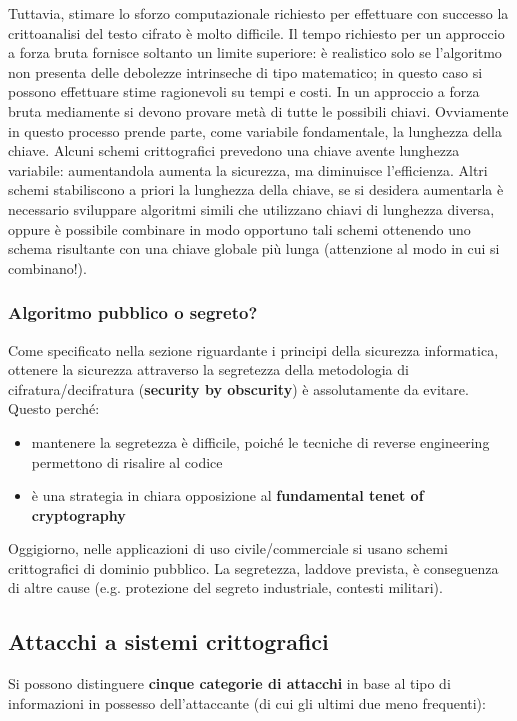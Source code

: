 Tuttavia, stimare lo sforzo computazionale richiesto per effettuare con successo la crittoanalisi del testo cifrato è molto difficile. Il tempo richiesto per un approccio a forza bruta fornisce soltanto un limite superiore: è realistico solo se l’algoritmo non presenta delle debolezze intrinseche di tipo matematico; in questo caso si possono effettuare stime ragionevoli su tempi e costi. In un approccio a forza bruta mediamente si devono provare metà di tutte le possibili chiavi. Ovviamente in questo processo prende parte, come variabile fondamentale, la lunghezza della chiave. Alcuni schemi crittografici prevedono una chiave avente lunghezza variabile: aumentandola aumenta la sicurezza, ma diminuisce l'efficienza. Altri schemi stabiliscono a priori la lunghezza della chiave, se si desidera aumentarla è necessario sviluppare algoritmi simili che utilizzano chiavi di lunghezza diversa, oppure è possibile combinare in modo opportuno tali schemi ottenendo uno schema risultante con una chiave globale più lunga (attenzione al modo in cui si combinano!).

\subsubsection{Algoritmo pubblico o segreto?}
Come specificato nella sezione riguardante i principi della sicurezza informatica, ottenere la sicurezza attraverso la segretezza della metodologia di cifratura/decifratura (\textbf{security by obscurity}) è assolutamente da evitare. Questo perché:
\begin{itemize} 
  \item mantenere la segretezza è difficile, poiché le tecniche di reverse engineering permettono di risalire al codice
  \item è una strategia in chiara opposizione al \textbf{fundamental tenet of cryptography}
\end{itemize}
Oggigiorno, nelle applicazioni di uso civile/commerciale si usano schemi crittografici di dominio pubblico. La segretezza, laddove prevista, è conseguenza di altre cause (e.g. protezione del segreto industriale, contesti militari).

\subsection{Attacchi a sistemi crittografici}
Si possono distinguere \textbf{cinque categorie di attacchi} in base al tipo di informazioni in possesso dell'attaccante (di cui gli ultimi due meno frequenti):

